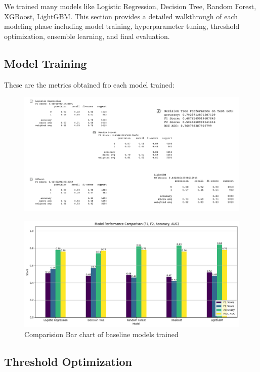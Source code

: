 \documentclass[12pt,a4paper]{article}
\begin{document}
We trained many models like Logistic Regression, Decision Tree, Random Forest, XGBoost,
LightGBM. This section provides a detailed walkthrough of each modeling phase including model
training, hyperparameter tuning, threshold optimization, ensemble learning, and final evaluation.

\subsection{Model Training}

These are the metrics obtained fro each model trained:

\begin{figure}[H]
    \centering
    \includegraphics[width=1\textwidth]{figures/14a.png}
\end{figure}
\begin{figure}[H]
    \centering
    \includegraphics[width=1\textwidth]{figures/14b.png}
    \caption{Comparision Bar chart of baseline models trained}
\end{figure}



\subsection{Threshold Optimization}
\end{document}
